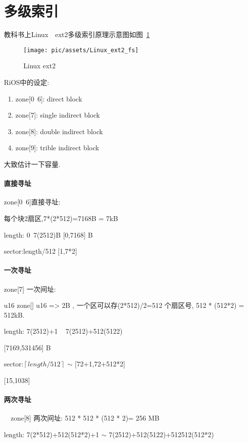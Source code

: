 \section{多级索引}

教科书上Linux　ext2多级索引原理示意图如图~\ref{Linux ext2 fs}~
\begin{figure}[!htbp]
	\centering	\texttt{[image: pic/assets/Linux\_ext2\_fs]}
	\caption{Linux ext2}	\label{Linux ext2 fs}	\end{figure}

RiOS中的设定:

\begin{enumerate}
\item  zone[0~6]:	direct block 
\item  zone[7]:	    single indirect block
\item  zone[8]:	    double indirect block 
\item  zone[9]:	    trible indirect block
\end{enumerate}

大致估计一下容量.

\paragraph{直接寻址} zone[0~6]直接寻址: 

    每个块2扇区,7*(2*512)=7168B = 7kB

 length: 0~7(2512)B              [0,7168] B

 sector:length/512 	[1,7*2]

\paragraph{一次寻址} zone[7] 一次间址: 

    u16 zone[] u16 => 2B , 一个区可以存(2*512)/2=512 个扇区号,
    512 * (512*2) = 512kB.

 length: 7(2512)+1 ~ 7(2512)+512(5122) 

        [7169,531456]  B

 sector:$\left\lceil{length/512}\right\rceil$   $\sim$   [72+1,72+512*2]

[15,1038]      

\paragraph{两次寻址}　zone[8] 两次间址: 512 * 512 * (512 * 2)= 256 MB 

 length:  7(2*512)+512(512*2)+1 $\sim$ 7(2512)+512(5122)+512512(512*2)


